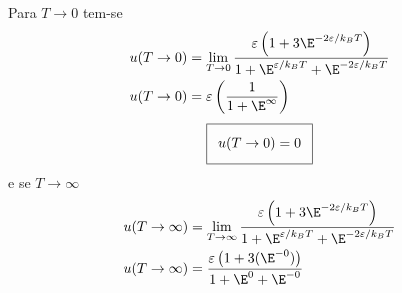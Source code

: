 \begin{prob}
\begin{sol}
\begin{enumerate}[label=\alph *)]
      Para $T\to 0$ tem-se
      \begin{align}
        \begin{split}
          u(T\to 0)&=\lim_{T\to 0}\frac{\varepsilon\left(1+3\E^{-2\varepsilon/k_BT}\right)}{1+\E^{\varepsilon/k_BT}+\E^{-2\varepsilon/k_BT}}\\
          u(T\to 0)&=\varepsilon\left(\frac{1}{1+\E^{\infty}}\right)
        \end{split}
      \end{align}
      \begin{align}
        \addtolength{\fboxsep}{5pt}
        \boxed{
          \begin{gathered}
            u(T\to 0)=0
          \end{gathered}
        }
      \end{align}
      e se $T\to\infty$
      \begin{align}
        \begin{split}
          u(T\to\infty)&=\lim_{T\to\infty}\frac{\varepsilon\left(1+3\E^{-2\varepsilon/k_BT}\right)}{1+\E^{\varepsilon/k_BT}+\E^{-2\varepsilon/k_BT}}\\
          u(T\to\infty)&=\frac{\varepsilon\left(1+3(\E^{-0})\right)}{1+\E^0+\E^{-0}}
        \end{split}
      \end{align}


\end{enumerate}
\end{sol}
\end{prob}
